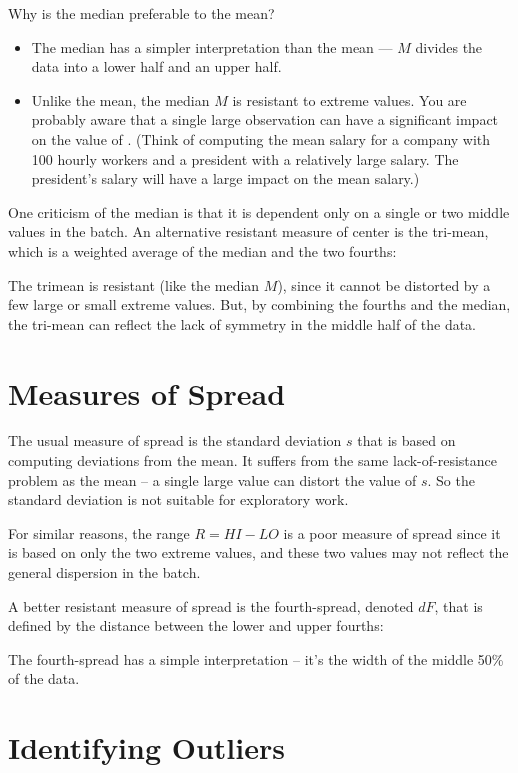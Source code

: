 \documentclass[
]{book}
\begin{document}
Why is the median preferable to the mean?

\begin{itemize}
\item
  The median has a simpler interpretation than the mean --- \(M\) divides the data into a lower half and an upper half.
\item
  Unlike the mean, the median \(M\) is resistant to extreme values. You are probably aware that a single large observation can have a significant impact on the value of . (Think of computing the mean salary for a company with 100 hourly workers and a president with a relatively large salary. The president's salary will have a large impact on the mean salary.)
\end{itemize}

One criticism of the median is that it is dependent only on a single or two middle values in the batch. An alternative resistant measure of center is the tri-mean, which is a weighted average of the median and the two fourths:

The trimean is resistant (like the median \(M\)), since it cannot be distorted by a few large or small extreme values. But, by combining the fourths and the median, the tri-mean can reflect the lack of symmetry in the middle half of the data.

\hypertarget{measures-of-spread}{%
\section{Measures of Spread}\label{measures-of-spread}}

The usual measure of spread is the standard deviation \(s\) that is based on computing deviations from the mean. It suffers from the same lack-of-resistance problem as the mean -- a single large value can distort the value of \(s\). So the standard deviation is not suitable for exploratory work.

For similar reasons, the range \(R = HI - LO\) is a poor measure of spread since it is based on only the two extreme values, and these two values may not reflect the general dispersion in the batch.

A better resistant measure of spread is the fourth-spread, denoted \(dF\), that is defined by the distance between the lower and upper fourths:

The fourth-spread has a simple interpretation -- it's the width of the middle 50\% of the data.

\hypertarget{identifying-outliers}{%
\section{Identifying Outliers}\label{identifying-outliers}}
\end{document}
